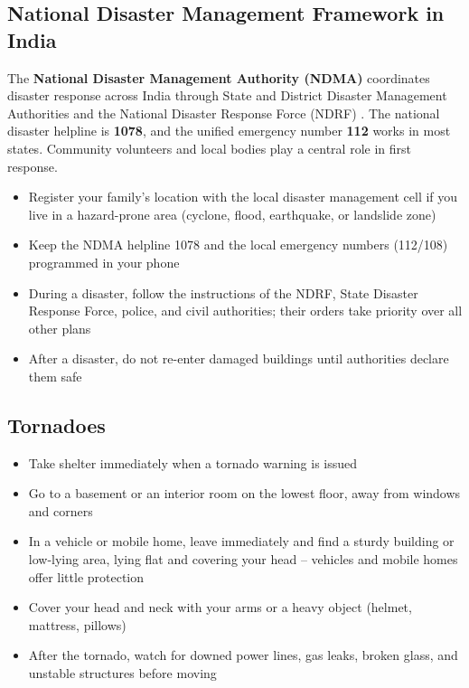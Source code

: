 \subsection{National Disaster Management Framework in India}

The \textbf{National Disaster Management Authority (NDMA)} coordinates disaster response across India through State and District Disaster Management Authorities and the National Disaster Response Force (NDRF) \cite{ndma}. The national disaster helpline is \textbf{1078}, and the unified emergency number \textbf{112} works in most states. Community volunteers and local bodies play a central role in first response.

\begin{itemize}
  \item Register your family's location with the local disaster management cell if you live in a hazard-prone area (cyclone, flood, earthquake, or landslide zone)
  \item Keep the NDMA helpline 1078 and the local emergency numbers (112/108) programmed in your phone
  \item During a disaster, follow the instructions of the NDRF, State Disaster Response Force, police, and civil authorities; their orders take priority over all other plans
  \item After a disaster, do not re-enter damaged buildings until authorities declare them safe
\end{itemize}

\subsection{Tornadoes}

\begin{itemize}
  \item Take shelter immediately when a tornado warning is issued
  \item Go to a basement or an interior room on the lowest floor, away from windows and corners
  \item In a vehicle or mobile home, leave immediately and find a sturdy building or low-lying area, lying flat and covering your head -- vehicles and mobile homes offer little protection
  \item Cover your head and neck with your arms or a heavy object (helmet, mattress, pillows)
  \item After the tornado, watch for downed power lines, gas leaks, broken glass, and unstable structures before moving
\end{itemize}

